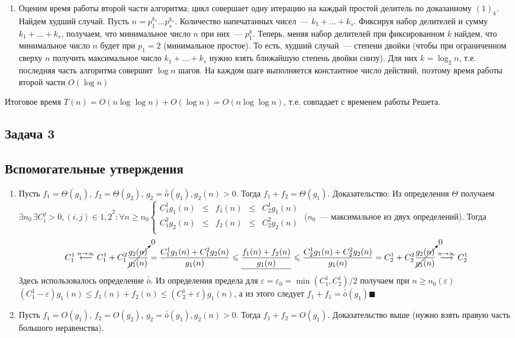 \documentclass[a4paper]{article}
\def\eps{\varepsilon}
\newcommand{\smallo}{\bar{\bar{o}}}
\begin{document}
\begin{enumerate}
\begin{enumerate}
\item Оценим время работы второй части алгоритма: цикл совершает одну итерацию на каждый простой делитель по доказанному $(1)_k$. Найдем худший случай. Пусть $n=p_1^{k_1}...p_s^{k_s}$. Количество напечатанных чисел~--- $k_1+...+k_s$. Фиксируя набор делителей и сумму $k_1+...+k_s$, получаем, что минимальное число $n$ при них~--- $p_1^k$. Теперь, меняя набор делителей при фиксированном $k$ найдем, что минимальное число $n$ будет при $p_1=2$ (минимальное простое). То есть, худший случай~--- степени двойки (чтобы при ограниченном сверху $n$ получить максимальное число $k_1+...+k_s$ нужно взять ближайшую степень двойки снизу). Для них $k=\log_2 n$, т.е. последняя часть алгоритма совершит $\log n$ шагов. На каждом шаге выполняется константное число действий, поэтому время работы второй части $O(\log n)$
\end{enumerate}
Итоговое время $T(n)=O(n\log\log n)+O(\log n)=O(n\log\log n)$, т.е. совпадает с временем работы Решета.
\end{enumerate}
\subsection*{Задача 3}
\subsection*{Вспомогательные утверждения}
\begin{enumerate}
\item \label{smallg2} Пусть $f_1=\Theta(g_1)$, $f_2=\Theta(g_2)$, $g_2=\smallo(g_1), g_2(n)>0$. Тогда $f_1+f_2=\Theta(g_1)$. Доказательство:\newline
Из определения $\Theta$ получаем $\exists n_0\,\exists C_i^j>0, (i,j)\in \overline{1,2}^2\colon\forall n\geqslant n_0 \left\{\begin{array}{lllll}
C_1^1g_1(n) & \leqslant & f_1(n) & \leqslant & C_2^1 g_1(n)\\
C_1^2g_2(n) & \leqslant & f_2(n) & \leqslant & C_2^2 g_2(n)\\
\end{array}\right.$ ($n_0$~--- максимальное из двух определений).
Тогда $$C_1^1\overset{n\to\infty}{\longleftarrow}C_1^1+C_1^2\cancelto{0}{\frac{g_2(n)}{g_1(n)}}=\frac{C_1^1 g_1(n)+C_1^2 g_2(n)}{g_1(n)}\leqslant\underline{\frac{f_1(n)+f_2(n)}{g_1(n)}}\leqslant \frac{C_2^1 g_1(n)+C_2^2 g_2(n)}{g_1(n)}=C_2^1+C_2^2\cancelto{0}{\frac{g_2(n)}{g_1(n)}}\overset{n\to\infty}{\longrightarrow}C_2^1$$
Здесь использовалось определение $\smallo$. Из определения предела для $\eps=\eps_0=\min(C_1^1,C_2^1)/2$ получаем при $n\geqslant n_0(\eps)$ $(C^1_1-\eps)g_1(n)\leqslant f_1(n)+f_2(n)\leqslant (C_2^1+\eps)g_1(n)$, а из этого следует $f_1+f_1=\smallo(g_1)\blacksquare$
\item \label{smallg2O} Пусть $f_1=O(g_1)$, $f_2=O(g_2)$, $g_2=\smallo(g_1), g_2(n)>0$. Тогда $f_1+f_2=O(g_1)$. Доказательство выше (нужно взять правую часть большого неравенства).
\end{enumerate}
\end{document}
